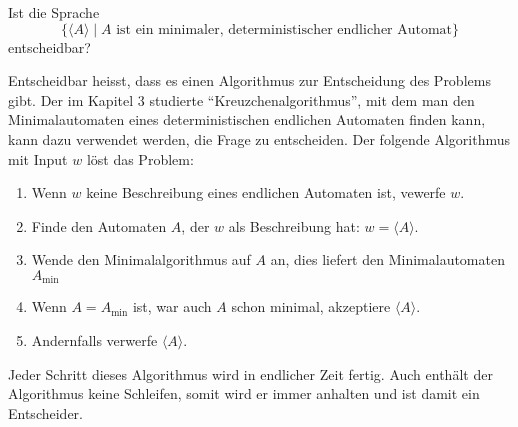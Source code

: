 Ist die Sprache
\[
\{
\langle A\rangle
\mid
\text{$A$ ist ein minimaler, deterministischer endlicher Automat}
\}
\]
entscheidbar?


\begin{loesung}
Entscheidbar heisst, dass es einen Algorithmus zur Entscheidung des
Problems gibt.
Der im Kapitel 3 studierte ``Kreuzchenalgorithmus'', mit dem man den
Minimalautomaten eines deterministischen endlichen Automaten finden
kann, kann dazu verwendet werden, die Frage zu entscheiden.
Der folgende Algorithmus mit Input $w$ löst das Problem:
\begin{enumerate}
\item
Wenn $w$ keine Beschreibung eines endlichen Automaten ist, vewerfe $w$.
\item
Finde den Automaten $A$, der $w$ als Beschreibung hat: $w=\langle A\rangle$.
\item
Wende den Minimalalgorithmus auf $A$ an, dies liefert den
Minimalautomaten
$A_\text{min}$
\item
Wenn $A=A_{\text{min}}$ ist, war auch $A$ schon minimal, akzeptiere
$\langle A\rangle$.
\item
Andernfalls verwerfe $\langle A\rangle $.
\end{enumerate}
Jeder Schritt dieses Algorithmus wird in endlicher Zeit fertig.
Auch enthält der Algorithmus keine Schleifen, somit wird er immer
anhalten und ist damit ein Entscheider.
\end{loesung}
